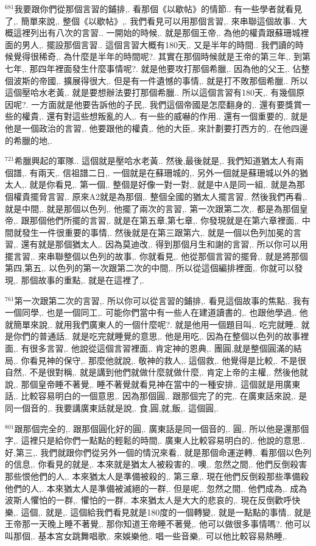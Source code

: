 \documentclass{book}
\begin{document}
$^{681}$我要跟你們從那個言習的鋪排,.
看那個《以歇帖》的情節..
有一些學者就看見了,.
簡單來說,.
整個《以歇帖》,.
我們看見可以用那個言習,.
來串聯這個故事..
大概這裡列出有八次的言習..
一開始的時候,.
就是那個王帝,.
為他的權貴跟蘇珊城裡面的男人,.
擺設那個言習..
這個言習大概有180天,.
又是半年的時間..
我們讀的時候覺得很稀奇,.
為什麼是半年的時間呢?.
其實在那個時候就是王帝的第三年,.
到第七年,.
那四年裡面發生什麼事情呢?.
就是他要攻打那個希臘,.
因為他的父王,.
佔整個波斯的帝國,.
擴展得很大,.
但是有一件遺憾的事情,.
就是打不敗那個希臘..
所以這個壓哈水老黃,.
就是要想辦法要打那個希臘..
所以這個言習有180天,.
有幾個原因呢?.
一方面就是他要告訴他的子民,.
我們這個帝國是怎麼翻身的,.
還有要獎賞一些的權貴,.
還有對這些想叛亂的人,.
有一些的威嚇的作用..
還有一個重要的,.
就是他是一個政治的言習,.
他要跟他的權貴,.
他的大臣,.
來計劃要打西方的,.
在他四邊的希臘的地,.

$^{721}$希臘興起的軍隊..
這個就是壓哈水老黃..
然後,最後就是,.
我們知道猶太人有兩個譜,.
有兩天,.
信祖譜二日,.
一個就是在蘇珊城的,.
另外一個就是蘇珊城以外的猶太人,.
就是你看見,.
第一個,.
整個是好像一對一對,.
就是中A是同一組,.
就是為那個權貴擺脅言習,.
原來A2就是為那個,.
整個全國的猶太人擺言習,.
然後我們再看,.
就是中間,.
就是那個以色列,.
他擺了兩次的言習,.
第一次跟第二次,.
都是為那個皇帝,.
跟那個他們所擺的言習,.
就是在第五章,第七章,.
你發現就是在第六章裡面,.
中間就發生一件很重要的事情,.
然後就是在第三跟第六,.
就是一個以色列加冕的言習,.
還有就是那個猶太人,.
因為莫迪改,.
得到那個月生和謝的言習,.
所以你可以用擺言習,.
來串聯整個以色列的故事,.
你就看見,.
他從那個言習的擺脅,.
就是將那個第四,第五,.
以色列的第一次跟第二次的中間,.
所以從這個編排裡面,.
你就可以發現,.
那個故事的重點,.
就是在這裡了,.

$^{761}$第一次跟第二次的言習,.
所以你可以從言習的鋪排,.
看見這個故事的焦點,.
我有一個同學,.
也是一個同工,.
可能你們當中有一些人在建道讀書的,.
也跟他學過,.
他就簡單來說,.
就用我們廣東人的一個什麼呢?.
就是他用一個題目叫,.
吃完就睡,.
就是你們的普通話,.
就是吃完就睡覺的意思,.
他是用吃,.
因為在整個以色列的故事裡面,.
有很多言習,.
他說從這個言習裡面,.
肯定神的恩典,.
團圓,就是整個圓滿的結局,.
你看見神的保守,.
那麼他就說,.
敬神的救人,.
這個救,.
他覺得是比較,.
不是很自然,.
不是很對稱,.
就是講到他們就做什麼就做什麼,.
肯定上帝的主權,.
然後他就說,.
那個皇帝睡不著覺,.
睡不著覺就看見神在當中的一種安排,.
這個就是用廣東話,.
比較容易明白的一個意思,.
因為那個圓,.
跟那個完了的完,.
在廣東話來說,.
是同一個音的,.
我要講廣東話就是說,.
食,圓,就,飯,.
這個圓,.

$^{801}$跟那個完全的,.
跟那個圓化好的圓,.
廣東話是同一個音的,.
圓,.
所以他是還那個字,.
這裡只是給你們一點點的輕鬆的時間,.
廣東人比較容易明白的,.
他說的意思..
好,第三,.
我們就跟你們從另外一個的情況來看,.
就是那個命運逆轉,.
看那個以色列的信息,.
你看見的就是,.
本來就是猶太人被殺害的,.
噢,.
忽然之間,.
他們反倒殺害那些恨他們的人,.
本來猶太人是準備被殺的,.
第三章,.
現在他們反倒殺那些準備殺他們的人,.
本來猶太人是準備被滅絕的一群,.
但是呢,.
忽然之間,.
他們成為,.
成為波斯人懼怕的一群,.
懼怕的一群,.
本來猶太人是大大的悲哀的,.
現在反倒歡呼快樂,.
這個,.
就是,.
這個給我們看見就是180度的一個轉變,.
就是一點點的事情,.
就是王帝那一天晚上睡不著覺,.
那你知道王帝睡不著覺,.
他可以做很多事情嗎?.
他可以叫那個,.
基本宮女跳舞唱歌,.
來娛樂他,.
唱一些音樂,.
可以他比較容易熱睡,.
\end{document}
